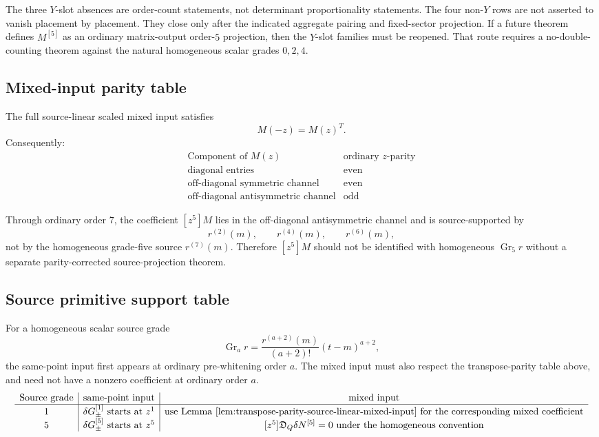 \documentclass[11pt,a4paper]{amsart}
\theoremstyle{plain}
\theoremstyle{definition}
\begin{document}
The three \(Y\)-slot absences are order-count statements, not determinant
proportionality statements.  The four non-\(Y\) rows are not asserted to
vanish placement by placement.  They close only after the indicated
aggregate pairing and fixed-sector projection.  If a future theorem
defines \(M^{[5]}\) as an ordinary matrix-output order-\(5\) projection,
then the \(Y\)-slot families must be reopened.  That route requires a
no-double-counting theorem against the natural homogeneous scalar grades
\(0,2,4\).

\subsection{Mixed-input parity table}
\label{app:mixed-input-parity-table}

The full source-linear scaled mixed input satisfies
\[
M(-z)=M(z)^T.
\]
Consequently:
\[
\begin{array}{c|c}
\text{Component of }M(z) & \text{ordinary }z\text{-parity}
\\
\hline
\text{diagonal entries} & \text{even}
\\
\text{off-diagonal symmetric channel} & \text{even}
\\
\text{off-diagonal antisymmetric channel} & \text{odd}
\end{array}
\]

Through ordinary order \(7\), the coefficient \([z^5]M\) lies in the
off-diagonal antisymmetric channel and is source-supported by
\[
r^{(2)}(m),\qquad r^{(4)}(m),\qquad r^{(6)}(m),
\]
not by the homogeneous grade-five source \(r^{(7)}(m)\).  Therefore
\([z^5]M\) should not be identified with homogeneous
\(\operatorname{Gr}_5 r\) without a separate parity-corrected
source-projection theorem.

\subsection{Source primitive support table}
\label{app:source-primitive-support-table}

For a homogeneous scalar source grade
\[
\operatorname{Gr}_a r
=
\frac{r^{(a+2)}(m)}{(a+2)!}(t-m)^{a+2},
\]
the same-point input first appears at ordinary pre-whitening order \(a\).
The mixed input must also respect the transpose-parity table above, and
need not have a nonzero coefficient at ordinary order \(a\).
\[
\begin{array}{c|c|c}
\text{Source grade} & \text{same-point input} & \text{mixed input}
\\
\hline
1
&
\delta G_\pm^{[1]}\text{ starts at }z^1
&
\text{use Lemma~\ref{lem:transpose-parity-source-linear-mixed-input}
for the corresponding mixed coefficient}
\\
5
&
\delta G_\pm^{[5]}\text{ starts at }z^5
&
[z^5]\mathfrak D_Q\delta N^{[5]}=0
\text{ under the homogeneous convention}
\end{array}
\]
\end{document}
